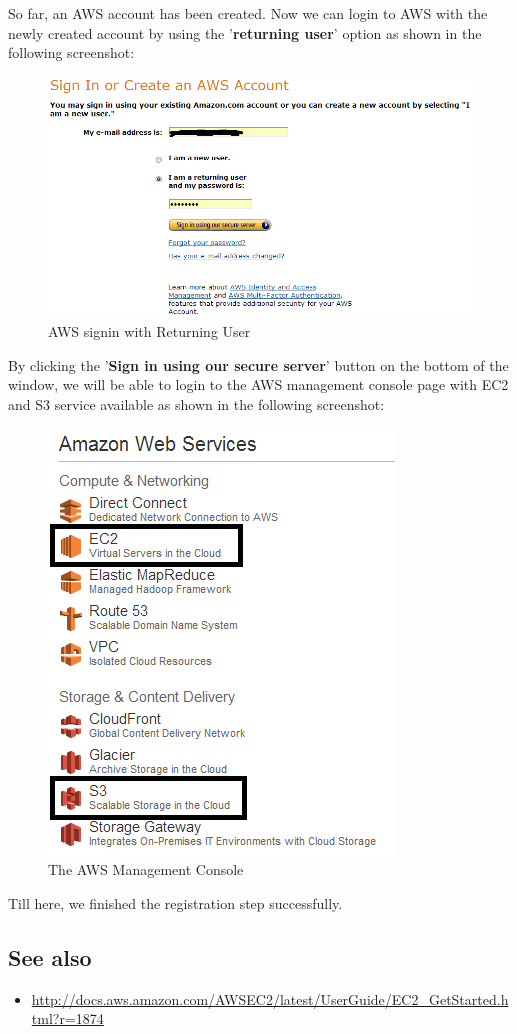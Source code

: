 So far, an AWS account has been created. Now we can login to AWS with the newly created account by using the '\textbf{returning user}' option as shown in the following screenshot:
\begin{figure}[ht]
  \centering
  \includegraphics[width=.8\textwidth]{figs/5163os_08_04.png}
  \caption{AWS signin with Returning User}\label{fig:aws.signin.return}
\end{figure} 
By clicking the '\textbf{Sign in using our secure server}' button on the bottom of the window, we will be able to login to the AWS management console page with EC2 and S3 service available as shown in the following screenshot:
\begin{figure}[ht]
  \centering
  \includegraphics[width=.5\textwidth]{figs/5163os_08_05.png}
  \caption{The AWS Management Console}\label{fig:aws.management.console}
\end{figure} 
Till here, we finished the registration step successfully.
\subsection*{See also}
\begin{itemize}
  \item \url{http://docs.aws.amazon.com/AWSEC2/latest/UserGuide/EC2_GetStarted.html?r=1874}
\end{itemize}

